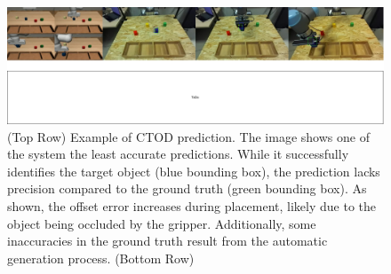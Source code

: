 \begin{figure}[t]
    \centering
    \includegraphics[width=1.0\textwidth]{figures/images/ch5/ctod_cod_prediction.jpg}
    \caption{(Top Row) Example of CTOD prediction. The image shows one of the system the least accurate predictions. While it successfully identifies the target object (blue bounding box), the prediction lacks precision compared to the ground truth (green bounding box). As shown, the offset error increases during placement, likely due to the object being occluded by the gripper. Additionally, some inaccuracies in the ground truth result from the automatic generation process. (Bottom Row) }
    \label{fig:ctod_cod_prediction}
\end{figure}
